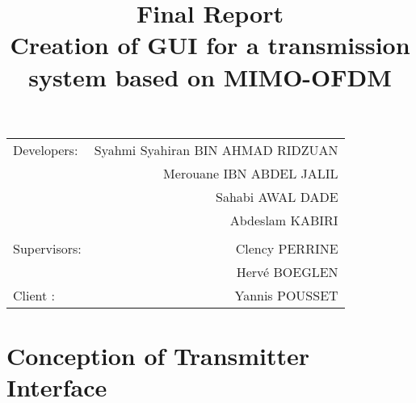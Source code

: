 \documentclass[12pt,a4paper]{article}
\begin{document}
\title{\textbf {\huge Final Report\\ Creation of GUI for a transmission system based on MIMO-OFDM}}
\maketitle

\begin{center}
\begin{tabular}{l r}
 
Developers: & Syahmi Syahiran BIN AHMAD RIDZUAN \\
& Merouane IBN ABDEL JALIL \\
& Sahabi AWAL DADE \\ 
& Abdeslam KABIRI\\ %
\\
Supervisors: &  Clency PERRINE \\ 
& Herv\'e BOEGLEN \\ %
Client : & Yannis POUSSET \\	
\end{tabular}
\end{center}

\clearpage

\section{Conception of Transmitter Interface}
\end{document}

